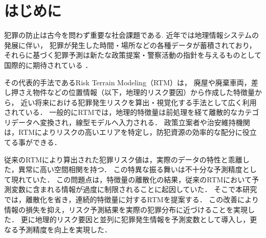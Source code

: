 \def\Style{``jsaiac.sty''}
\def\BibTeX{{\rm B\kern-.05em{\sc i\kern-.025em b}\kern-.08em%
 T\kern-.1667em\lower.7ex\hbox{E}\kern-.125emX}}
\def\JBibTeX{\leavevmode\lower .6ex\hbox{J}\kern-0.15em\BibTeX}
\def\LaTeXe{\LaTeX\kern.15em2$_{\textstyle\varepsilon}$}


\maketitle

\section{はじめに}
犯罪の防止は古今を問わず重要な社会課題である.
近年では地理情報システムの発展に伴い，
犯罪が発生した時間・場所などの各種データが蓄積されており\cite{ChicagoDataPortal}，
それらに基づく犯罪予測は新たな政策提案・警察活動の指針を与えるものとして国際的に期待されている
\cite{犯罪予測}．

その代表的手法であるRisk Terrain Modeling（RTM）\cite{caplan2015risk}は，
廃屋や廃棄車両，差し押さえ物件などの位置情報（以下，地理的リスク要因）から作成した特徴量から，
近い将来における犯罪発生リスクを算出・視覚化する手法として広く利用されている\cite{地理的犯罪予測研究の潮流}．
一般的にRTMでは，地理的特徴量は前処理を経て離散的なカテゴリデータへ変換され，線型モデルへ入力される\cite{犯罪予測, caplan2015risk}．
政策立案者や治安維持機関は，RTMによりリスクの高いエリアを特定し，防犯資源の効率的な配分に役立てる事ができる\cite{犯罪予測}．

従来のRTMにより算出された犯罪リスク値は，実際のデータの特性と乖離した，異常に高い空間相関を持つ．
この特異な振る舞いは不十分な予測精度として現れていた．
この問題点は，特徴量の離散化の結果，従来のRTMにおいて予測変数に含まれる情報が過度に制限されることに起因していた．
そこで本研究では，離散化を省き，連続的特徴量に対するRTMを提案する．
この改善により情報の損失を抑え，リスク予測結果を実際の犯罪分布に近づけることを実現した．
更に地理的リスク要因と並列に犯罪発生情報を予測変数として導入し，更なる予測精度を向上を実現した．

